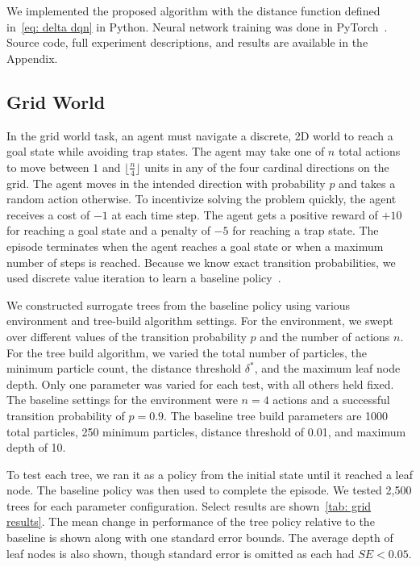 \documentclass[letterpaper]{article} %
\begin{document}
We implemented the proposed algorithm with the distance function defined in~\cref{eq: delta dqn} in Python. %
Neural network training was done in PyTorch~\cite{paszke2015}.
Source code, full experiment descriptions, and results are available in the Appendix.
\subsection{Grid World}
In the grid world task, an agent must navigate a discrete, 2D world to reach a goal state while avoiding trap states.
The agent may take one of $n$ total actions to move between $1$ and $\lfloor \frac{n}{4}\rfloor$ units in any of the four cardinal directions on the grid.
The agent moves in the intended direction with probability $p$ and takes a random action otherwise.
To incentivize solving the problem quickly, the agent receives a cost of $-1$ at each time step.
The agent gets a positive reward of $+10$ for reaching a goal state and a penalty of $-5$ for reaching a trap state.
The episode terminates when the agent reaches a goal state or when a maximum number of steps is reached.
Because we know exact transition probabilities, we used discrete value iteration to learn a baseline policy~\cite{sutton1998}.

We constructed surrogate trees from the baseline policy using various environment and tree-build algorithm settings.
For the environment, we swept over different values of the transition probability $p$ and the number of actions $n$.
For the tree build algorithm, we varied the total number of particles, the minimum particle count, the distance threshold $\delta^*$, and the maximum leaf node depth.
Only one parameter was varied for each test, with all others held fixed.
The baseline settings for the environment were $n=4$ actions and a successful transition probability of $p=0.9$.
The baseline tree build parameters are 1000 total particles, 250 minimum particles, distance threshold of 0.01, and maximum depth of 10.

To test each tree, we ran it as a policy from the initial state until it reached a leaf node.
The baseline policy was then used to complete the episode.
We tested 2,500 trees for each parameter configuration.
Select results are shown~\cref{tab: grid results}.
The mean change in performance of the tree policy relative to the baseline is shown along with one standard error bounds.
The average depth of leaf nodes is also shown, though standard error is omitted as each had $SE < 0.05$.
\end{document}
